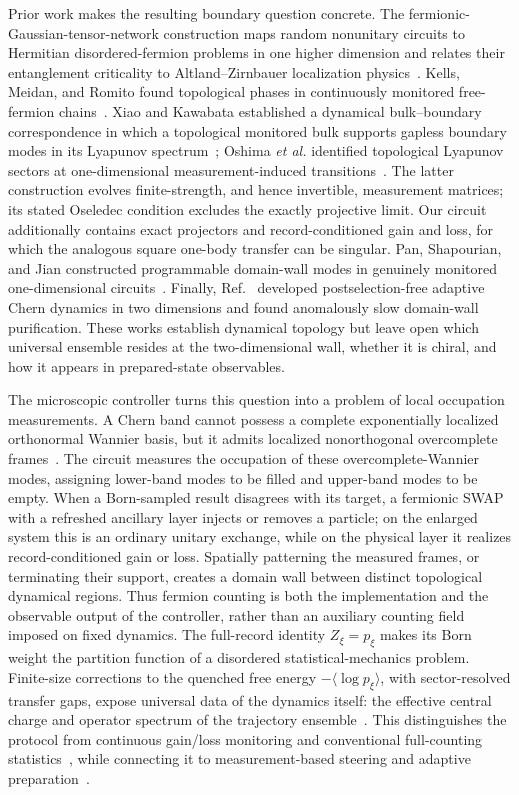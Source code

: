 \documentclass[aps,prb,twocolumn,superscriptaddress,longbibliography]{revtex4-2}
\theoremstyle{plain}
\theoremstyle{definition}
\theoremstyle{remark}
\begin{document}
Prior work makes the resulting boundary question concrete.  The fermionic-Gaussian-tensor-network construction maps random nonunitary circuits to Hermitian disordered-fermion problems in one higher dimension and relates their entanglement criticality to Altland--Zirnbauer localization physics~\cite{Jian2022}.  Kells, Meidan, and Romito found topological phases in continuously monitored free-fermion chains~\cite{Kells2023}.  Xiao and Kawabata established a dynamical bulk--boundary correspondence in which a topological monitored bulk supports gapless boundary modes in its Lyapunov spectrum~\cite{XiaoKawabata2026}; Oshima \emph{et al.} identified topological Lyapunov sectors at one-dimensional measurement-induced transitions~\cite{Oshima2025}.  The latter construction evolves finite-strength, and hence invertible, measurement matrices; its stated Oseledec condition excludes the exactly projective limit.  Our circuit additionally contains exact projectors and record-conditioned gain and loss, for which the analogous square one-body transfer can be singular.  Pan, Shapourian, and Jian constructed programmable domain-wall modes in genuinely monitored one-dimensional circuits~\cite{PanShapourianJian2025}.  Finally, Ref.~\cite{BhuiyanPanJian2026} developed postselection-free adaptive Chern dynamics in two dimensions and found anomalously slow domain-wall purification.  These works establish dynamical topology but leave open which universal ensemble resides at the two-dimensional wall, whether it is chiral, and how it appears in prepared-state observables.

The microscopic controller turns this question into a problem of local occupation measurements.  A Chern band cannot possess a complete exponentially localized orthonormal Wannier basis, but it admits localized nonorthogonal overcomplete frames~\cite{Brouder2007,DubailRead2015,LiDongLedwithKhalaf2024}.  The circuit measures the occupation of these overcomplete-Wannier modes, assigning lower-band modes to be filled and upper-band modes to be empty.  When a Born-sampled result disagrees with its target, a fermionic SWAP with a refreshed ancillary layer injects or removes a particle; on the enlarged system this is an ordinary unitary exchange, while on the physical layer it realizes record-conditioned gain or loss.  Spatially patterning the measured frames, or terminating their support, creates a domain wall between distinct topological dynamical regions.  Thus fermion counting is both the implementation and the observable output of the controller, rather than an auxiliary counting field imposed on fixed dynamics.  The full-record identity $Z_\xi=p_\xi$ makes its Born weight the partition function of a disordered statistical-mechanics problem.  Finite-size corrections to the quenched free energy $-\langle\log p_\xi\rangle$, with sector-resolved transfer gaps, expose universal data of the dynamics itself: the effective central charge and operator spectrum of the trajectory ensemble~\cite{Zabalo2022}.  This distinguishes the protocol from continuous gain/loss monitoring and conventional full-counting statistics~\cite{Landi2024,Starchl2025,Soares2025}, while connecting it to measurement-based steering and adaptive preparation~\cite{Roy2020,Puente2024,Smith2024,Doerstel2026}.
\end{document}
